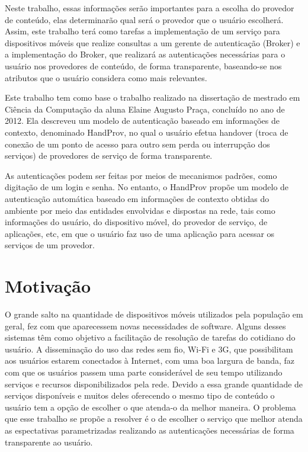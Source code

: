 Neste trabalho, essas informações serão importantes para a escolha do provedor de conteúdo, elas determinarão qual será o provedor que o usuário escolherá. Assim, este trabalho terá como tarefas a implementação de um serviço para dispositivos móveis que realize consultas a um gerente de autenticação (Broker) e a implementação do Broker, que realizará as autenticações necessárias para o usuário nos provedores de conteúdo, de forma transparente, baseando-se nos atributos que o usuário considera como mais relevantes.

Este trabalho tem como base o trabalho realizado na dissertação de mestrado em Ciência da Computação da aluna Elaine Augusto Praça, concluído no ano de 2012. Ela descreveu um modelo de autenticação baseado em informações de contexto, denominado HandProv, no qual o usuário efetua handover (troca de conexão de um ponto de acesso para outro sem perda ou interrupção dos serviços) de provedores de serviço de forma transparente.

\begin{citacao}
As autenticações podem ser feitas por meios de mecanismos padrões, como digitação de um login e senha. No entanto, o HandProv propõe um modelo de autenticação automática baseado em informações de contexto obtidas do ambiente por meio das entidades envolvidas e dispostas na rede, tais como informações do usuário, do dispositivo móvel, do provedor de serviço, de aplicações, etc, em que o usuário faz uso de uma aplicação para acessar os serviços de um provedor. \cite{praca12}
\end{citacao}

\section{Motivação}
O grande salto na quantidade de dispositivos móveis utilizados pela população em geral, fez com que aparecessem novas necessidades de software. Alguns desses sistemas têm como objetivo a facilitação de resolução de tarefas do cotidiano do usuário.
A disseminação do uso das redes sem fio, Wi-Fi e 3G, que possibilitam aos usuários estarem conectados à Internet, com uma boa largura de banda, faz com que os usuários passem uma parte considerável de seu tempo utilizando serviços e recursos disponibilizados pela rede.
Devido a essa grande quantidade de serviços disponíveis e muitos deles oferecendo o mesmo tipo de conteúdo o usuário tem a opção de escolher o que atenda-o da melhor maneira.
O problema que esse trabalho se propõe a resolver é o de escolher o serviço que melhor atenda as espectativas parametrizadas realizando as autenticações necessárias de forma transparente ao usuário.

